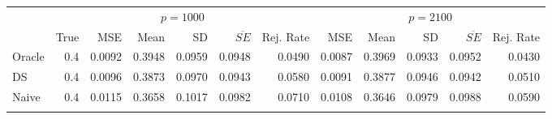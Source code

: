 \begin{tabular}{llllllllllll}
\cline{1-12}
\multicolumn{1}{c}{} &
  \multicolumn{6}{|c}{$ p = 1000 $} &
  \multicolumn{5}{c}{$ p = 2100 $} \\
\multicolumn{1}{c}{} &
  \multicolumn{1}{|r}{True} &
  \multicolumn{1}{r}{MSE} &
  \multicolumn{1}{r}{Mean} &
  \multicolumn{1}{r}{SD} &
  \multicolumn{1}{r}{$\overline{SE}$} &
  \multicolumn{1}{r}{Rej. Rate} &
  \multicolumn{1}{r}{MSE} &
  \multicolumn{1}{r}{Mean} &
  \multicolumn{1}{r}{SD} &
  \multicolumn{1}{r}{$\overline{SE}$} &
  \multicolumn{1}{r}{Rej. Rate} \\
\cline{1-12}
\multicolumn{1}{l}{\hspace{1em}Oracle} &
  \multicolumn{1}{|r}{0.4} &
  \multicolumn{1}{r}{0.0092} &
  \multicolumn{1}{r}{0.3948} &
  \multicolumn{1}{r}{0.0959} &
  \multicolumn{1}{r}{0.0948} &
  \multicolumn{1}{r}{0.0490} &
  \multicolumn{1}{r}{0.0087} &
  \multicolumn{1}{r}{0.3969} &
  \multicolumn{1}{r}{0.0933} &
  \multicolumn{1}{r}{0.0952} &
  \multicolumn{1}{r}{0.0430} \\
\multicolumn{1}{l}{\hspace{1em}DS} &
  \multicolumn{1}{|r}{0.4} &
  \multicolumn{1}{r}{0.0096} &
  \multicolumn{1}{r}{0.3873} &
  \multicolumn{1}{r}{0.0970} &
  \multicolumn{1}{r}{0.0943} &
  \multicolumn{1}{r}{0.0580} &
  \multicolumn{1}{r}{0.0091} &
  \multicolumn{1}{r}{0.3877} &
  \multicolumn{1}{r}{0.0946} &
  \multicolumn{1}{r}{0.0942} &
  \multicolumn{1}{r}{0.0510} \\
\multicolumn{1}{l}{\hspace{1em}Naive} &
  \multicolumn{1}{|r}{0.4} &
  \multicolumn{1}{r}{0.0115} &
  \multicolumn{1}{r}{0.3658} &
  \multicolumn{1}{r}{0.1017} &
  \multicolumn{1}{r}{0.0982} &
  \multicolumn{1}{r}{0.0710} &
  \multicolumn{1}{r}{0.0108} &
  \multicolumn{1}{r}{0.3646} &
  \multicolumn{1}{r}{0.0979} &
  \multicolumn{1}{r}{0.0988} &
  \multicolumn{1}{r}{0.0590} \\
\multicolumn{1}{l}{} &
  \multicolumn{1}{|r}{} &
  \multicolumn{1}{r}{} &
  \multicolumn{1}{r}{} &
  \multicolumn{1}{r}{} &
  \multicolumn{1}{r}{} &
  \multicolumn{1}{r}{} &
  \multicolumn{1}{r}{} &
  \multicolumn{1}{r}{} &

\end{tabular}
